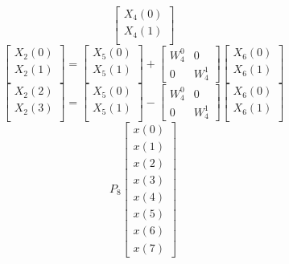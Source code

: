 \documentclass[journal,12pt,twocolumn]{IEEEtran}
\renewcommand\thesection{\arabic{section}}
\begin{document}
\begin{enumerate}[label=\arabic*.,ref=\thesection.\theenumi]
\begin{equation}
\begin{bmatrix}
X_{4}(0) \\ 
X_{4}(1) \\ 
\end{bmatrix}
\end{equation}
\begin{equation}
\begin{bmatrix}
X_{2}(0) \\ 
X_{2}(1)\\ 
\end{bmatrix}
=
\begin{bmatrix}
X_{5}(0) \\ 
X_{5}(1)\\ 
\end{bmatrix}
+
\begin{bmatrix}
W^{0}_{4} & 0\\
0 & W^{1}_{4}
\end{bmatrix}
\begin{bmatrix}
X_{6}(0) \\ 
X_{6}(1) \\ 
\end{bmatrix}
\end{equation}
\begin{equation}
\begin{bmatrix}
X_{2}(2) \\ 
X_{2}(3)\\ 
\end{bmatrix}
=
\begin{bmatrix}
X_{5}(0) \\ 
X_{5}(1)\\ 
\end{bmatrix}
-
\begin{bmatrix}
W^{0}_{4} & 0\\
0 & W^{1}_{4}
\end{bmatrix}
\begin{bmatrix}
X_{6}(0) \\ 
X_{6}(1) \\ 
\end{bmatrix}
\end{equation}
\begin{equation}
P_{8}
\begin{bmatrix}
x(0) \\ 
x(1) \\ 
x(2) \\ 
x(3) \\ 
x(4) \\ 
x(5) \\
x(6) \\
x(7)
\end{bmatrix}

\end{equation}
\end{enumerate}
\end{document}
